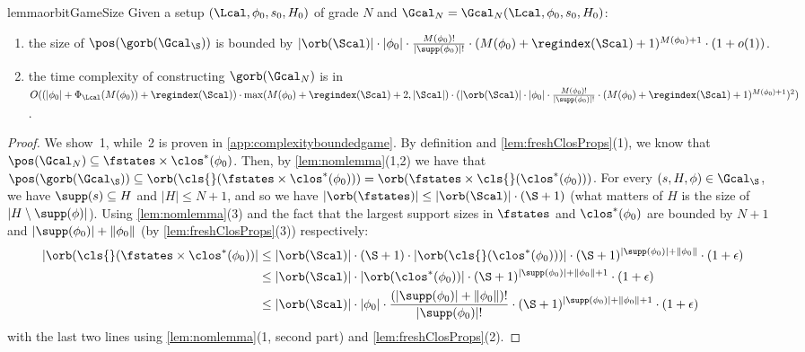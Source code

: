\begin{restatable}{lemma}{orbitGameSize}\label{lem:orbitGameSize}\label{lem:fnomparsize}
  Given a setup $(\Lcal,\phi_0,s_0,H_0)$ of grade $N$ and $\Gcal_N=\Gcal_N(\Lcal, \phi_0, s_0, H_0)$:
  \begin{enumerate}
    \item the size of $\pos(\gorb(\Gcal_\S))$ is bounded by
    $
        |\orb(\Scal)| \cdot|\phi_0|\cdot \frac{M({\phi_0})!}{|\supp(\phi_0)|!}\cdot (M(\phi_0)+\regindex(\Scal) + 1)^{M(\phi_0) + 1}\cdot(1+o(1))
    $.
    \item the time complexity of constructing $\gorb(\Gcal_N)$ is in
$ O(   (|\phi_0| + \Phi_\Lcal(M(\phi_0)) +\regindex(\Scal))
    \cdot
    \max(M(\phi_0)+\regindex(\Scal) + 2, |\Scal|
    )  \cdot 
    (|\orb(\Scal)| \cdot|\phi_0|\cdot \frac{M(\phi_0)!}{|\supp(\phi_0)|!}\cdot (M(\phi_0)+\regindex(\Scal) + 1)^{M(\phi_0) + 1})
    ^2)$.
\end{enumerate}
\end{restatable}
\begin{proof}  We show~1, while~2 is proven in \cref{app:complexityboundedgame}.
    By definition and \cref{lem:freshClosProps}(1), we know that $\pos(\Gcal_N) \subseteq \fstates \times \clos^*(\phi_0)$.
        Then, by \cref{lem:nomlemma}(1,2) we have that $\pos(\gorb(\Gcal_\S)) \subseteq \orb(\cls{}(\fstates \times \clos^*(\phi_0))) = \orb(\fstates \times \cls{}(\clos^*(\phi_0)))$.
    For every $(s, H, \phi) \in \Gcal_\S$, we have $\supp(s) \subseteq H$ and $|H|\leq N+1$, and so we have $|\orb(\fstates)| \le |\orb(\Scal)| \cdot (\S + 1)$ (what matters of $H$ is the size of $|H\setminus\supp(\phi)|$).
    Using \cref{lem:nomlemma}(3) and the fact that the largest support sizes in $\fstates$ and $\clos^*(\phi_0)$ are bounded by $N+1$ and $|\supp(\phi_0)| + \|\phi_0\|$ (by \cref{lem:freshClosProps}(3)) respectively:
    \begin{align*}
        |\orb(\cls{}(\fstates \times \clos^*(\phi_0))| &\le |\orb(\Scal)| \cdot (\S + 1) \cdot|\orb(\cls{}(\clos^*(\phi_0)))|\cdot (\S + 1)^{|\supp(\phi_0)| + \|\phi_0\|}\cdot(1 + \epsilon) 
        \\ &\le |\orb(\Scal)| \cdot|\orb(\clos^*(\phi_0))|\cdot (\S + 1)^{|\supp(\phi_0)| + \|\phi_0\| + 1}\cdot(1+\epsilon)
\\
        &\le |\orb(\Scal)| \cdot|\phi_0|\cdot \frac{(|\supp(\phi_0)|+\|\phi_0\|)!}{|\supp(\phi_0)|!}\cdot (\S + 1)^{|\supp(\phi_0)| + \|\phi_0\| + 1}\cdot(1+\epsilon)
    \end{align*}
    with the last two lines using \cref{lem:nomlemma}(1, second part) and \cref{lem:freshClosProps}(2).
\end{proof}

